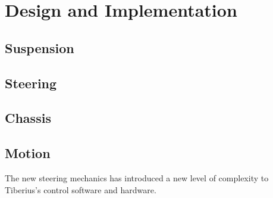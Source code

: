 \section{Design and Implementation}

\subsection{Suspension}

\subsection{Steering}

\subsection{Chassis}


\subsection{Motion}

The new steering mechanics has introduced a new level of complexity to Tiberius's control software and hardware. 